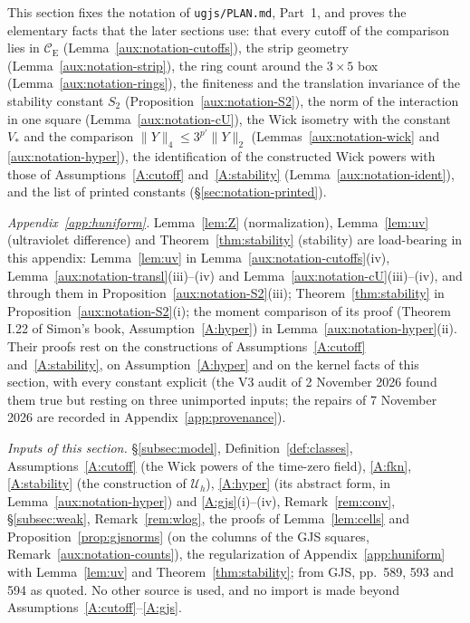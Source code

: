 \documentclass[11pt,a4paper]{article}
\theoremstyle{plain}
\theoremstyle{definition}
\theoremstyle{plain}
\theoremstyle{definition}
\newcommand{\CE}{\mathcal{C}_{\mathrm E}}
\begin{document}
This section fixes the notation of \texttt{ugjs/PLAN.md}, Part~1, and proves the elementary
facts that the later sections use: that every cutoff of the comparison lies in $\CE$
(Lemma~\ref{aux:notation-cutoffs}), the strip geometry (Lemma~\ref{aux:notation-strip}), the
ring count around the $3\times5$ box (Lemma~\ref{aux:notation-rings}), the finiteness and the
translation invariance of the stability constant $S_2$
(Proposition~\ref{aux:notation-S2}), the norm of the interaction in one square
(Lemma~\ref{aux:notation-cU}), the Wick isometry with the constant $V_*$ and the comparison
$\|Y\|_4\le3^{p'}\|Y\|_2$ (Lemmas~\ref{aux:notation-wick} and \ref{aux:notation-hyper}), the
identification of the constructed Wick powers with those of Assumptions~\ref{A:cutoff}
and~\ref{A:stability} (Lemma~\ref{aux:notation-ident}), and the list of printed constants
(\S\ref{sec:notation-printed}).

\emph{Appendix~\ref{app:huniform}.}  Lemma~\ref{lem:Z} (normalization), Lemma~\ref{lem:uv}
(ultraviolet difference) and Theorem~\ref{thm:stability} (stability) are load-bearing in this
appendix: Lemma~\ref{lem:uv} in Lemma~\ref{aux:notation-cutoffs}(iv),
Lemma~\ref{aux:notation-transl}(iii)--(iv) and Lemma~\ref{aux:notation-cU}(iii)--(iv), and
through them in Proposition~\ref{aux:notation-S2}(iii); Theorem~\ref{thm:stability} in
Proposition~\ref{aux:notation-S2}(i); the moment comparison of its proof (Theorem I.22 of
Simon's book, Assumption~\ref{A:hyper}) in Lemma~\ref{aux:notation-hyper}(ii).  Their proofs
rest on the constructions of Assumptions~\ref{A:cutoff} and~\ref{A:stability}, on
Assumption~\ref{A:hyper} and on the kernel facts of this section, with every constant
explicit (the V3 audit of 2 November 2026 found them true but resting on three unimported
inputs; the repairs of 7 November 2026 are recorded in Appendix~\ref{app:provenance}).

\emph{Inputs of this section.}  \S\ref{subsec:model}, Definition~\ref{def:classes},
Assumptions~\ref{A:cutoff} (the Wick powers of the time-zero field), \ref{A:fkn},
\ref{A:stability} (the construction of $\mathcal U_h$), \ref{A:hyper} (its abstract form,
in Lemma~\ref{aux:notation-hyper}) and \ref{A:gjs}(i)--(iv), Remark~\ref{rem:conv},
\S\ref{subsec:weak}, Remark~\ref{rem:wlog}, the proofs of Lemma~\ref{lem:cells} and
Proposition~\ref{prop:gjsnorms} (on the columns of the GJS squares,
Remark~\ref{aux:notation-counts}), the regularization of Appendix~\ref{app:huniform} with
Lemma~\ref{lem:uv} and Theorem~\ref{thm:stability}; from GJS, pp.~589, 593 and 594 as quoted.
No other source is used, and no import is made beyond Assumptions~\ref{A:cutoff}--\ref{A:gjs}.
\end{document}
